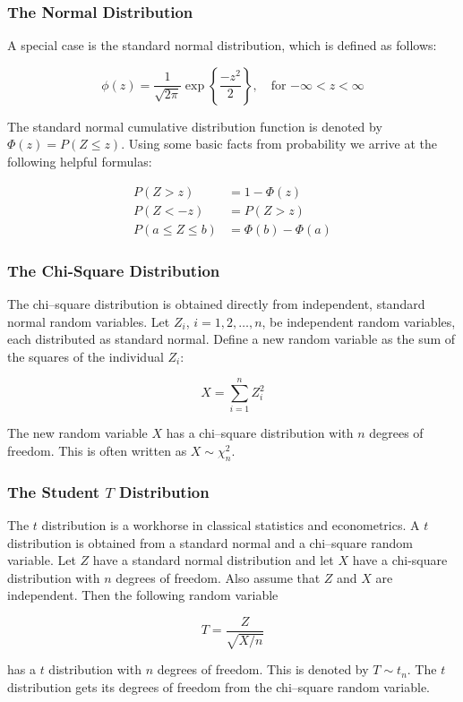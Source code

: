 \documentclass[12pt]{beamer}
\begin{document}
\begin{frame}
\frametitle{The Normal Distribution}
A special case is the standard normal distribution, which is defined as follows:

\begin{equation*}
\phi(z) = \frac{1}{\sqrt{2\pi}} \exp\left\{\frac{-z^{2}}{2}\right\}, \quad \mbox{for $-\infty < z < \infty$} 
\end{equation*}

\vspace{5mm}
The standard normal cumulative distribution function is denoted by $\Phi(z) = P(Z \leq z)$. Using some basic 
facts from probability we arrive at the following helpful formulas:

\begin{align*}
P(Z > z)  &= 1 - \Phi(z) \\
P(Z < -z) &= P(Z > z) \\
P(a \leq Z \leq b) &= \Phi(b) - \Phi(a)
\end{align*}
\end{frame}


\begin{frame}
\frametitle{The Chi-Square Distribution}
The chi--square distribution is obtained directly from independent, standard normal random variables.
Let $Z_{i}$, $i = 1, 2, \ldots, n$, be independent random variables, each distributed as standard normal. Define a
new random variable as the sum of the squares of the individual $Z_{i}$:

\vspace{5mm}
\begin{equation*}
X = \sum\limits_{i=1}^{n} Z_{i}^{2}
\end{equation*}

\vspace{5mm}
The new random variable $X$ has a chi--square distribution with $n$ degrees of freedom. This is 
often written as $X \sim \chi_{n}^{2}$.
\end{frame}


\begin{frame}
\frametitle{The Student $T$ Distribution}
The $t$ distribution is a workhorse in classical statistics and econometrics. A $t$ distribution is
obtained from a standard normal and a chi--square random variable. Let $Z$ have a standard normal distribution
and let $X$ have a chi-square distribution with $n$ degrees of freedom. Also assume that $Z$ and $X$ are independent.
Then the following random variable

\vspace{5mm}
\begin{equation*}
T = \frac{Z}{\sqrt{X/n}}
\end{equation*} 

\vspace{5mm}
has a $t$ distribution with $n$ degrees of freedom. This is denoted by $T \sim t_{n}$. The $t$ distribution gets
its degrees of freedom from the chi--square random variable.
\end{frame}
\end{document}
